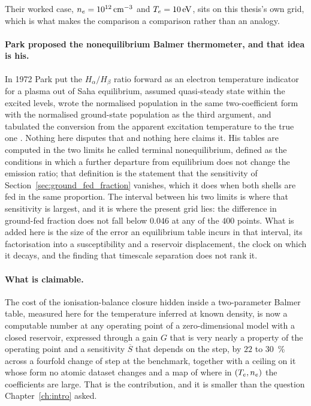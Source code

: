 Their worked case, $n_e = \SI{e12}{\per\cubic\centi\metre}$ and
$T_e = \SI{10}{\electronvolt}$, sits on this thesis's own grid, which is what
makes the comparison a comparison rather than an analogy.

\paragraph{Park proposed the nonequilibrium Balmer thermometer, and that idea
is his.} In 1972 Park put the $H_\alpha/H_\beta$ ratio forward as an electron
temperature indicator for a plasma out of Saha equilibrium, assumed
quasi-steady state within the excited levels, wrote the normalised population
in the same two-coefficient form with the normalised ground-state population as
the third argument, and tabulated the conversion from the apparent excitation
temperature to the true one \cite{Park1972}. Nothing here disputes that and
nothing here claims it. His tables are computed in the two limits he called
terminal nonequilibrium, defined as the conditions in which a further departure
from equilibrium does not change the emission ratio; that definition is the
statement that the sensitivity of Section~\ref{sec:ground_fed_fraction}
vanishes, which it does when both shells are fed in the same proportion. The
interval between his two limits is where that sensitivity is largest, and it is
where the present grid lies: the difference in ground-fed fraction does not
fall below $0.046$ at any of the $400$ points. What is added here is the size
of the error an equilibrium table incurs in that interval, its factorisation
into a susceptibility and a reservoir displacement, the clock on which it
decays, and the finding that timescale separation does not rank it.

\paragraph{What is claimable.} The cost of the ionisation-balance
closure hidden inside a two-parameter Balmer table, measured here for the
temperature inferred at known density, is now a computable number at any
operating point of a zero-dimensional model with a closed reservoir, expressed
through a gain $G$ that is very nearly a property of the operating point and a
sensitivity $\overline{S}$ that depends on the step, by $22$ to
\SI{30}{\percent} across a fourfold change of step at the benchmark, together
with a
ceiling on it whose form no atomic dataset changes and a map of where in
$(T_e,n_e)$ the coefficients are large. That is the contribution, and it is
smaller than the question Chapter~\ref{ch:intro} asked.

